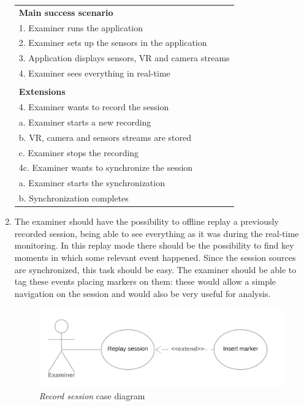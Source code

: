 \documentclass[binding=0.6cm,LaM]{sapthesis}
\begin{document}
\begin{enumerate}
\begin{center}
\begin{tabular}{ l }
\textbf{Main success scenario} \\
1. Examiner runs the application\\
2. Examiner sets up the sensors in the application \\
3. Application displays sensors, VR and camera streams \\
4. Examiner sees everything in real-time \\

\vspace{0.1cm}\\

\textbf{Extensions} \\
4. Examiner wants to record the session\\
\quad a. Examiner starts a new recording \\
\quad b. VR, camera and sensors streams are stored \\
\quad c. Examiner stops the recording \\

4c. Examiner wants to synchronize the session\\
\quad a. Examiner starts the synchronization \\
\quad b. Synchronization completes \\

\end{tabular}

\end{center}

\item The examiner should have the possibility to offline replay a previously recorded session, being able to see everything as it was during the real-time monitoring. In this replay mode there should be the possibility to find key moments in which some relevant event happened. Since the session sources are synchronized, this task should be easy. The examiner should be able to tag these events placing markers on them: these would allow a simple navigation on the session and would also be very useful for analysis.

\begin{figure}[h]
\centering
\includegraphics[scale=.257]{images/use_case_2}
\caption{\textit{Record session} case diagram}
\end{figure}


\end{enumerate}
\end{document}

